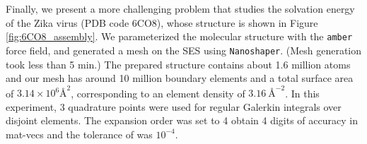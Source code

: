 Finally, we present a more challenging problem that studies the solvation energy of the Zika virus (PDB code 6CO8), whose structure \cite{sevvana2018refinement} is shown in Figure \ref{fig:6CO8_assembly}.
We parameterized the molecular structure with the \texttt{amber} \cite{caseAmberBiomolecularSimulation2005} force field, and generated a mesh on the SES using \texttt{Nanoshaper}. (Mesh generation took less than 5 min.)
The prepared structure contains about 1.6 million atoms and our mesh has around 10 million boundary elements and a total surface area of $3.14\times 10^6 {\si{\angstrom}}^{2}$, corresponding to an element density of $\SI{3.16}{\angstrom}^{-2}$.
In this experiment, 3 quadrature points were used for regular Galerkin integrals over disjoint elements.
The \fmm expansion order was set to 4 obtain 4 digits of accuracy in mat-vecs and the tolerance of \gmres was $10^{-4}$.


